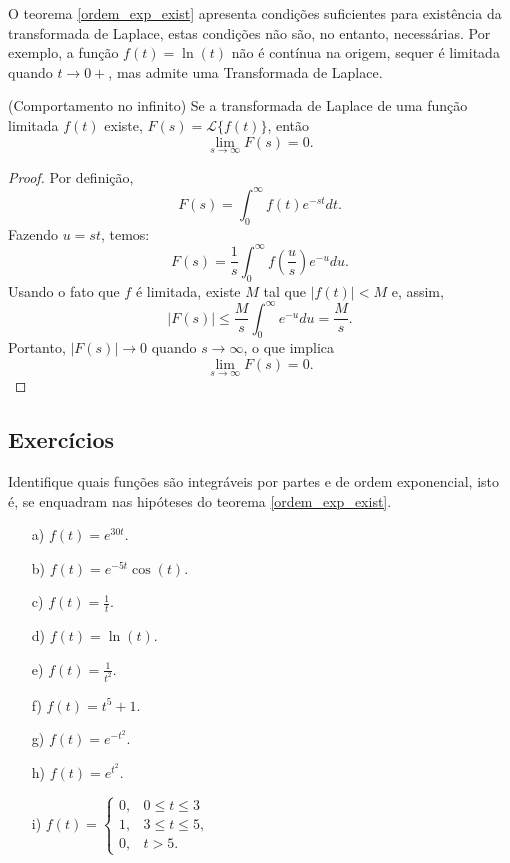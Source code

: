 \begin{obs} O teorema \ref{ordem_exp_exist} apresenta condições suficientes para existência da transformada de Laplace, estas condições não são, no entanto, necessárias. Por exemplo, a função $f(t)=\ln(t)$ não é contínua na origem, sequer é limitada quando $t\to 0+$, mas admite uma Transformada de Laplace.
 \end{obs}
\begin{teo} (Comportamento no infinito) Se a transformada de Laplace de uma função limitada $f(t)$ existe, $F(s)=\mathcal{L}\{f(t)\}$, então
$$
\lim_{s\to\infty}F(s)=0.
$$
\end{teo}
\begin{proof}
 Por definição,
 $$
 F(s)=\int_0^\infty f(t)e^{-st}dt.
 $$
Fazendo $u=st$, temos:
$$
 F(s)=\frac{1}{s}\int_0^\infty f\left(\frac{u}{s}\right)e^{-u}du.
 $$
 Usando o fato que $f$ é limitada, existe $M$ tal que $|f(t)|<M$ e, assim,
$$
| F(s) |\leq \frac{M}{s}\int_0^\infty e^{-u}du = \frac{M}{s}.
 $$ 
 Portanto, $|F(s)|\to 0$ quando $s\to \infty$, o que implica 
 $$
\lim_{s\to\infty}F(s)=0.
$$
\end{proof}

\subsection*{Exercícios}
\begin{exer}Identifique quais funções são integráveis por partes e de ordem exponencial, isto é, se enquadram nas hipóteses do teorema \ref{ordem_exp_exist}.
\begin{itemize}
 \item[a)] $f(t)=e^{30t}$.
 \item[b)] $f(t)=e^{-5t}\cos(t) $.
 \item[c)] $f(t)=\frac{1}{t}$.
 \item[d)] $f(t)=\ln(t)$.
 \item[e)] $f(t)=\frac{1}{t^2}$.
  \item[f)] $f(t)=t^{5}+1$.
  \item[g)] $f(t)=e^{-t^2}$.
  \item[h)] $f(t)=e^{t^2}$.

  
  \item[i)] $
f(t)=\left\{\begin{array}{ll} 0, &0\leq t\leq 3\\ 1, & 3\leq t\leq 5,\\0,&t>5.
\end{array}\right.
$
\end{itemize}


\end{exer}


